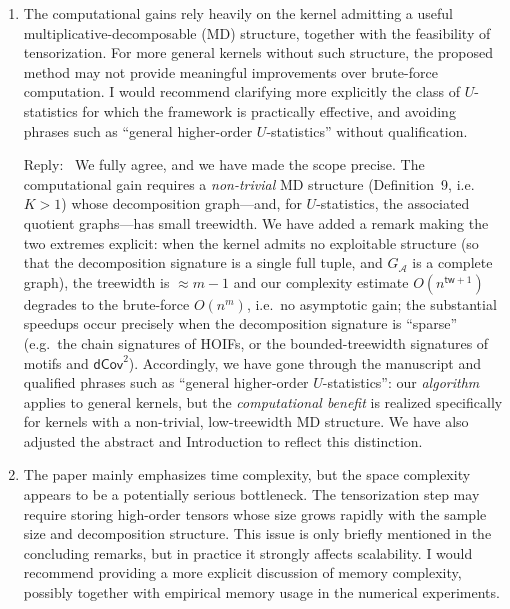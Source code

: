 \documentclass[12pt]{article}
\newenvironment{reply}{\par\smallskip\noindent\color{blue}Reply:\ \ignorespaces}{\par}
\newcommand{\less}{O}          %
\newcommand{\calA}{\mathcal{A}}
\begin{document}
\begin{enumerate}

\item The computational gains rely heavily on the kernel admitting a useful multiplicative-decomposable (MD) structure, together with the feasibility of tensorization. For more general kernels without such structure, the proposed method may not provide meaningful improvements over brute-force computation. I would recommend clarifying more explicitly the class of $U$-statistics for which the framework is practically effective, and avoiding phrases such as ``general higher-order $U$-statistics'' without qualification.

\begin{reply}
We fully agree, and we have made the scope precise. The computational gain requires a \emph{non-trivial} MD structure (Definition~9, i.e.\ $K>1$) whose decomposition graph---and, for $U$-statistics, the associated quotient graphs---has small treewidth. We have added a remark making the two extremes explicit: when the kernel admits no exploitable structure (so that the decomposition signature is a single full tuple, and $G_{\calA}$ is a complete graph), the treewidth is $\approx m-1$ and our complexity estimate $\less(n^{\mathsf{tw}+1})$ degrades to the brute-force $\less(n^{m})$, i.e.\ no asymptotic gain; the substantial speedups occur precisely when the decomposition signature is ``sparse'' (e.g.\ the chain signatures of HOIFs, or the bounded-treewidth signatures of motifs and $\mathsf{dCov}^2$). Accordingly, we have gone through the manuscript and qualified phrases such as ``general higher-order $U$-statistics'': our \emph{algorithm} applies to general kernels, but the \emph{computational benefit} is realized specifically for kernels with a non-trivial, low-treewidth MD structure. We have also adjusted the abstract and Introduction to reflect this distinction.
\end{reply}

\item The paper mainly emphasizes time complexity, but the space complexity appears to be a potentially serious bottleneck. The tensorization step may require storing high-order tensors whose size grows rapidly with the sample size and decomposition structure. This issue is only briefly mentioned in the concluding remarks, but in practice it strongly affects scalability. I would recommend providing a more explicit discussion of memory complexity, possibly together with empirical memory usage in the numerical experiments.


\end{enumerate}
\end{document}
